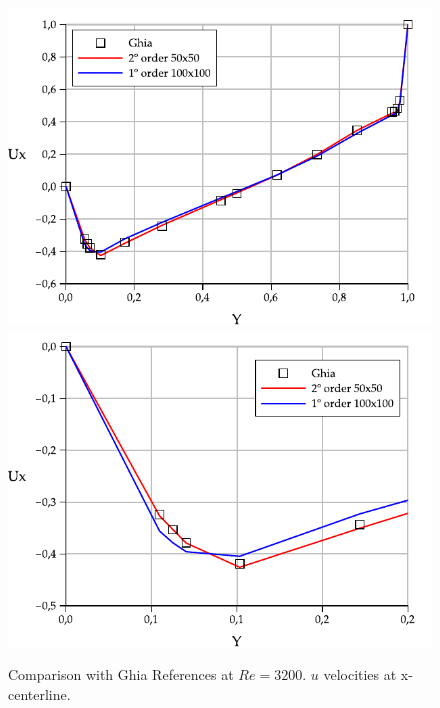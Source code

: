 \begin{figure}[htbp]
  \begin{center}
      \includegraphics[width=.85\linewidth]{../images/Re_3200_Ux.pdf}
      \includegraphics[width=.85\linewidth]{../images/Re_3200_Ux_zoom.pdf}
  \end{center}
  \caption{\label{fg:Re3200} Comparison with Ghia References at $Re=3200$. $u$ velocities at x-centerline.}
\end{figure}

